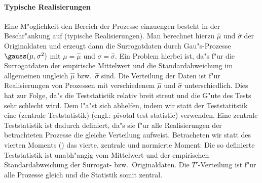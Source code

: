 \paragraph{Typische Realisierungen}
Eine M"oglichkeit den Bereich der Prozesse einzuengen besteht in der Beschr"ankung auf
\begriff(typische Realisierungen). Man berechnet hierzu $\hat\mu$ und $\hat\sigma$ der Originaldaten
und erzeugt dann die Surrogatdaten durch Gau"s-Prozesse $\gauss(\mu,\sigma^2)$ mit
$\mu=\hat\mu$ und $\sigma=\hat\sigma$. Ein Problem hierbei ist, da"s f"ur die
Surrogatdaten der empirische Mittelwert und die Standardabweichung im allgemeinen ungleich
$\hat\mu$ bzw.\ $\hat\sigma$ sind\footnotemark. Die Verteilung der Daten ist f"ur Realisierungen von 
Prozessen mit verschiedenem $\hat\mu$ und $\hat\sigma$ unterschiedlich. Dies hat zur Folge, da"s die Teststatistik relativ
breit streut und die G"ute des Tests sehr schlecht wird. Dem l"a"st sich
abhelfen, indem wir statt der Teststatitstik  eine
\begriff(zentrale Teststatistik) (engl.: pivotal test statistic) verwenden. Eine zentrale
Teststatistik ist dadurch definiert, da"s sie f"ur
alle Realisierungen der betrachteten Prozesse die gleiche Verteilung aufweist. 
Betracheten wir statt des vierten Moments () das vierte, zentrale
und normierte Moment:
Die so definierte Teststatistik ist unabh"angig vom Mittelwert und der empirischen
Standardabweichung der Surrogat- bzw.\ Originaldaten. Die $T'$-Verteilung ist f"ur alle
Prozesse gleich und die Statistik somit zentral.



